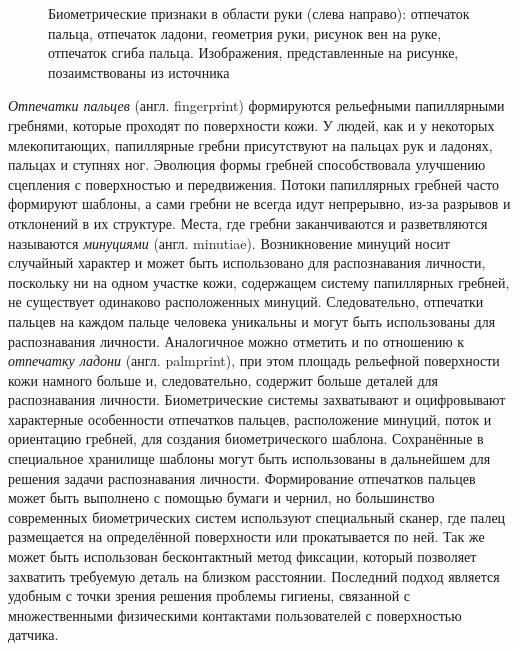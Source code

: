 \documentclass[12pt]{book}
\begin{document}
\begin{figure}[h]
\caption{Биометрические признаки в области руки (слева направо): отпечаток пальца, отпечаток ладони, геометрия руки, рисунок вен на руке, отпечаток сгиба пальца. Изображения, представленные на рисунке, позаимствованы из источника \cite{unar_2014}}
\label{fig:figure_1_2}
\end{figure}

\large{\textit{Отпечатки пальцев} (англ. fingerprint) формируются рельефными папиллярными гребнями, которые проходят по поверхности кожи. У людей, как и у некоторых млекопитающих, папиллярные гребни присутствуют на пальцах рук и ладонях, пальцах и ступнях ног. Эволюция формы гребней способствовала улучшению сцепления с поверхностью и передвижения. Потоки папиллярных гребней часто формируют шаблоны, а сами гребни не всегда идут непрерывно, из-за разрывов и отклонений в их структуре. Места, где гребни заканчиваются и разветвляются называются \textit{минуциями} (англ. minutiae). Возникновение минуций носит случайный характер и может быть использовано для распознавания личности, поскольку ни на одном участке кожи, содержащем систему папиллярных гребней, не существует одинаково расположенных минуций. Следовательно, отпечатки пальцев на каждом пальце человека уникальны и могут быть использованы для распознавания личности. Аналогичное можно отметить и по отношению к \textit{отпечатку ладони} (англ. palmprint), при этом площадь рельефной поверхности кожи намного больше и, следовательно, содержит больше деталей для распознавания личности. Биометрические системы захватывают и оцифровывают характерные особенности отпечатков пальцев, расположение минуций, поток и ориентацию гребней, для создания биометрического шаблона. Сохранённые в специальное хранилище шаблоны могут быть использованы в дальнейшем для решения задачи распознавания личности. Формирование отпечатков пальцев может быть выполнено с помощью бумаги и чернил, но большинство современных биометрических систем используют специальный сканер, где палец размещается на определённой поверхности или прокатывается по ней. Так же может быть использован бесконтактный метод фиксации, который позволяет захватить требуемую деталь на близком расстоянии. Последний подход является удобным с точки зрения решения проблемы гигиены, связанной с множественными физическими контактами пользователей с поверхностью датчика.} 
\end{document}
